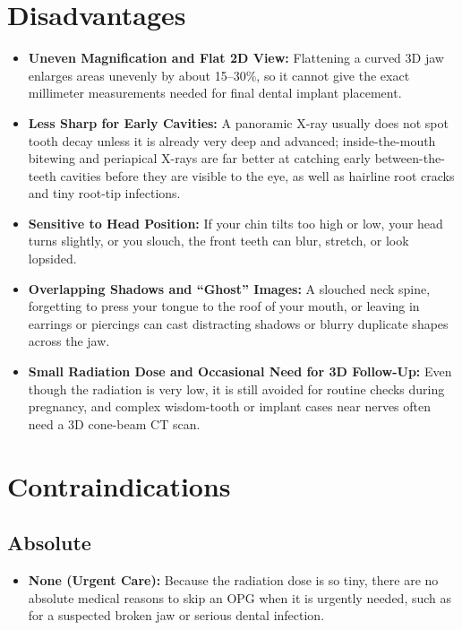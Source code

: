 \section{Disadvantages}
\begin{itemize}
\item \textbf{Uneven Magnification and Flat 2D View:} Flattening a curved 3D jaw enlarges areas unevenly by about 15--30\%, so it cannot give the exact millimeter measurements needed for final dental implant placement.
\item \textbf{Less Sharp for Early Cavities:} A panoramic X-ray usually does not spot tooth decay unless it is already very deep and advanced; inside-the-mouth bitewing and periapical X-rays are far better at catching early between-the-teeth cavities before they are visible to the eye, as well as hairline root cracks and tiny root-tip infections.
\item \textbf{Sensitive to Head Position:} If your chin tilts too high or low, your head turns slightly, or you slouch, the front teeth can blur, stretch, or look lopsided.
\item \textbf{Overlapping Shadows and ``Ghost'' Images:} A slouched neck spine, forgetting to press your tongue to the roof of your mouth, or leaving in earrings or piercings can cast distracting shadows or blurry duplicate shapes across the jaw.
\item \textbf{Small Radiation Dose and Occasional Need for 3D Follow-Up:} Even though the radiation is very low, it is still avoided for routine checks during pregnancy, and complex wisdom-tooth or implant cases near nerves often need a 3D cone-beam CT scan.
\end{itemize}

\section{Contraindications}

\subsection{Absolute}
\begin{itemize}
\item \textbf{None (Urgent Care):} Because the radiation dose is so tiny, there are no absolute medical reasons to skip an OPG when it is urgently needed, such as for a suspected broken jaw or serious dental infection.
\end{itemize}


